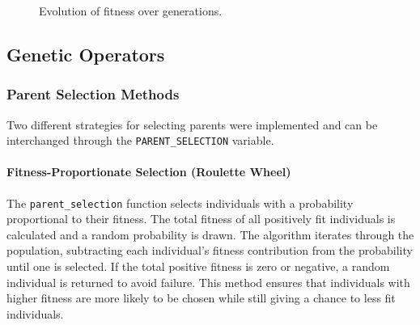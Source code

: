 \documentclass{article}
\begin{document}
\begin{figure}[h]
    \caption{Evolution of fitness over generations.}
\end{figure}


\subsection{Genetic Operators}

\subsubsection{Parent Selection Methods}

Two different strategies for selecting parents were implemented and can be interchanged through the \texttt{PARENT\_SELECTION} variable.

\paragraph{Fitness-Proportionate Selection (Roulette Wheel)}
The \texttt{parent\_selection} function selects individuals with a probability proportional to their fitness. The total fitness of all positively fit individuals is calculated and a random probability is drawn. The algorithm iterates through the population, subtracting each individual's fitness contribution from the probability until one is selected. If the total positive fitness is zero or negative, a random individual is returned to avoid failure. This method ensures that individuals with higher fitness are more likely to be chosen while still giving a chance to less fit individuals.
\end{document}
